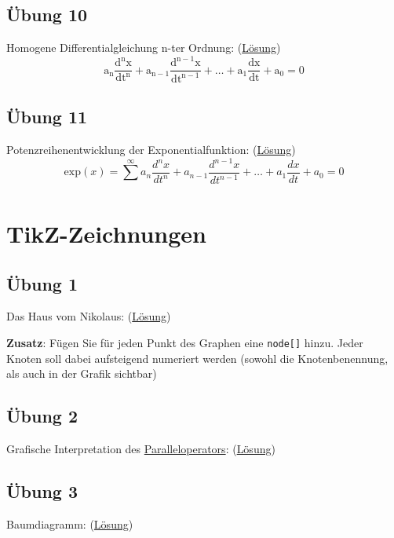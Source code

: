 \documentclass[11pt, oneside, a4paper, titlepage, ngerman]{scrreprt}
\newcommand{\sol}{Lösung}
\begin{document}
\subsection{Übung 10}
\label{sub:math10}
Homogene Differentialgleichung n-ter Ordnung: (\hyperref[sub:math10_sol]{\sol}) {\large
\begin{equation}
	\mathrm{a_n \dfrac{d^n x}{dt^n} + a_{n-1} \dfrac{d^{n-1} x}{dt^{n-1}} + \dots + a_{1} \dfrac{dx}{dt} + a_{0} = 0} 
\end{equation} }

\subsection{Übung 11}
\label{sub:math11}
Potenzreihenentwicklung der Exponentialfunktion: (\hyperref[sub:math11_sol]{\sol}) {\large
\begin{equation}
	\mathrm{exp}(x) = \sum \limits _{} ^{\infty} a_n \frac{d^n x}{dt^n} + a_{n-1} \frac{d^{n-1} x}{dt^{n-1}} + \dots + a_{1} \frac{dx}{dt} + a_{0} = 0
\end{equation} }
\clearpage

\section{TikZ-Zeichnungen}
\label{sec:tikz}

\subsection{Übung 1}
\label{sub:tikz1}
Das Haus vom Nikolaus: (\hyperref[sub:tikz1_sol]{\sol})
\begin{figure}[H]
\centering
	
\end{figure}
\textbf{Zusatz}: Fügen Sie für jeden Punkt des Graphen eine \verb|node[]| hinzu. Jeder Knoten soll dabei aufsteigend numeriert werden (sowohl die Knotenbenennung, als auch in der Grafik sichtbar)

\subsection{Übung 2}
\label{sub:tikz2}
Grafische Interpretation des \hyperref[sub:math4]{Paralleloperators}: (\hyperref[sub:tikz2_sol]{\sol})
\begin{figure}[H]
\centering
	
\end{figure}

\subsection{Übung 3}
\label{sub:tikz3}
Baumdiagramm: (\hyperref[sub:tikz3_sol]{\sol})
\begin{figure}[H]
\centering
	
\end{figure}
\end{document}
